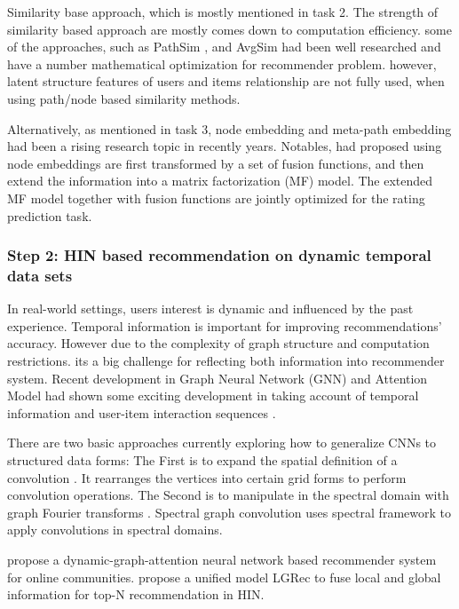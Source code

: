 Similarity base approach, which is mostly mentioned in task 2. The strength of similarity based approach are mostly comes down to computation efficiency. some of the approaches, such as PathSim \citep{Sun2011PathSim}, and AvgSim \citep{xiao2016avgsim} had been well researched and have a number mathematical optimization for recommender problem. however, latent structure features of users and items relationship are not fully used, when using path/node based similarity methods.

Alternatively, as mentioned in task 3, node embedding and meta-path embedding had been a rising research topic in recently years. Notables, \citet{shi2018heterogeneous} had proposed using node embeddings are first transformed by a set of fusion functions, and then extend the information into a matrix factorization (MF) model. The extended MF model together with fusion functions are jointly optimized for the rating prediction task.

\subsubsection*{Step 2: HIN based recommendation on dynamic temporal data sets}

In real-world settings, users interest is dynamic and influenced by the past experience. Temporal information is important for improving recommendations' accuracy. However due to the complexity of graph structure and computation restrictions. its a big challenge for reflecting both information into recommender system. Recent development in Graph Neural Network (GNN) and Attention Model had shown some exciting development in taking account of temporal information and user-item interaction sequences \citep{yu2017spatio}.  

There are two basic approaches currently exploring how to generalize CNNs to structured data forms: 
The First is to expand the spatial definition of a convolution \citep{niepert2016learning}. It rearranges the vertices into certain grid forms to perform convolution operations. The Second is to manipulate in the spectral domain with graph Fourier transforms \citep{bruna2013spectral}. Spectral graph convolution uses spectral framework to apply convolutions in spectral domains.

\citet{song2019session} propose a dynamic-graph-attention neural network based recommender system for online communities. \citet{Hu2018recommender} propose a unified model LGRec to fuse local and global information for top-N recommendation in HIN.


